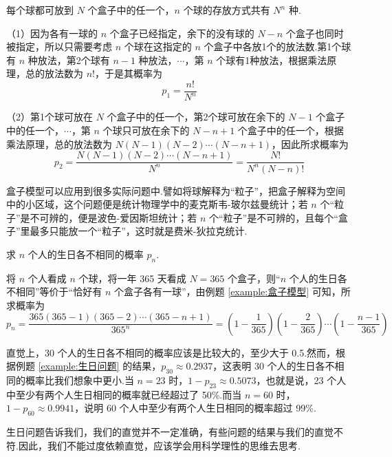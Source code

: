 \begin{solution}
    每个球都可放到 $N$ 个盒子中的任一个，$n$ 个球的存放方式共有 $N^n$ 种.

    （1）因为各有一球的 $n$ 个盒子已经指定，余下的没有球的 $N-n$ 个盒子也同时被指定，所以只需要考虑 $n$ 个球在这指定的 $n$ 个盒子中各放1个的放法数.第1个球有 $n$ 种放法，第2个球有 $n-1$ 种放法，$\cdots$，第 $n$ 个球有1种放法，根据乘法原理，总的放法数为 $n!$，于是其概率为
    $$
    p_1 = \dfrac{n!}{N^n}
    $$

    （2）第1个球可放在 $N$ 个盒子中的任一个，第2个球可放在余下的 $N-1$ 个盒子中的任一个，$\cdots$，第 $n$ 个球只可放在余下的 $N-n+1$ 个盒子中的任一个，根据乘法原理，总的放法数为 $N (N-1) (N-2) \cdots (N-n+1)$，因此所求概率为
    $$
    p_2 = \dfrac{N (N-1) (N-2) \cdots (N-n+1)}{N^n} = \dfrac{N!}{N^n (N-n)!}
    $$
\end{solution}

\begin{note}
    \indent 盒子模型可以应用到很多实际问题中.譬如将球解释为“粒子”，把盒子解释为空间中的小区域，这个问题便是统计物理学中的麦克斯韦-玻尔兹曼统计；若 $n$ 个“粒子”是不可辨的，便是波色-爱因斯坦统计；若 $n$ 个“粒子”是不可辨的，且每个“盒子”里最多只能放一个“粒子”，这时就是费米-狄拉克统计.
\end{note}

\begin{example}
    \indent 求 $n$ 个人的生日各不相同的概率 $p_n$.
\end{example}

\begin{solution}
    将 $n$ 个人看成 $n$ 个球，将一年 365 天看成 $N=365$ 个盒子，则“$n$ 个人的生日各不相同”等价于“恰好有 $n$ 个盒子各有一球”，由例题 \ref{example:盒子模型} 可知，所求概率为
    $$
    p_n = \dfrac{365 (365-1) (365-2) \cdots (365-n+1)}{365^n} = \left( 1 - \dfrac{1}{365} \right) \left( 1 - \dfrac{2}{365} \right) \cdots \left( 1 - \dfrac{n-1}{365} \right)
    $$
\end{solution}

\begin{note}
    \indent 直觉上，30 个人的生日各不相同的概率应该是比较大的，至少大于 0.5.然而，根据例题 \ref{example:生日问题} 的结果，$p_{30} \approx 0.2937$，这表明 30 个人的生日各不相同的概率比我们想象中更小.当 $n=23$ 时，$1 - p_{23} \approx 0.5073$，也就是说，23 个人中至少有两个人生日相同的概率就已经超过了 50\%.而当 $n=60$ 时，$1 - p_{60} \approx 0.9941$，说明 60 个人中至少有两个人生日相同的概率超过 99\%.

    生日问题告诉我们，我们的直觉并不一定准确，有些问题的结果与我们的直觉不符.因此，我们不能过度依赖直觉，应该学会用科学理性的思维去思考.
\end{note}

